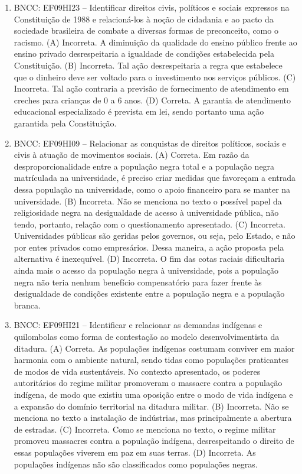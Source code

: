 
\begin{enumerate}
\item
BNCC: EF09HI23 -- Identificar direitos civis, políticos e sociais
expressos na Constituição de 1988 e relacioná-los à noção de cidadania e
ao pacto da sociedade brasileira de combate a diversas formas de
preconceito, como o racismo. (A) Incorreta. A diminuição da qualidade do ensino público frente ao ensino privado desrespeitaria a igualdade de condições estabelecida pela Constituição. (B) Incorreta. Tal ação desrespeitaria a regra que estabelece que o dinheiro deve ser voltado para o investimento nos serviços públicos. (C) Incorreta. Tal ação contraria a previsão de fornecimento de atendimento em creches para crianças de 0 a 6 anos. (D) Correta. A garantia de atendimento educacional especializado é prevista em lei, sendo portanto uma ação garantida pela Constituição.

\item
BNCC: EF09HI09 -- Relacionar as conquistas de direitos políticos,
sociais e civis à atuação de movimentos sociais. (A) Correta. Em razão da desproporcionalidade entre a população negra total e a população negra matrículada na universidade, é preciso criar medidas que favoreçam a entrada dessa população na universidade, como o apoio financeiro para se manter na universidade. (B) Incorreta. Não se menciona no texto o possível papel da religiosidade negra na desigualdade de acesso à universidade pública, não tendo, portanto, relação com o questionamento apresentado. (C) Incorreta. Universidades públicas são geridas pelos governos, ou seja, pelo Estado, e não por entes privados como empresários. Dessa maneira, a ação proposta pela alternativa é inexequível. (D) Incorreta. O fim das cotas raciais dificultaria ainda mais o acesso da população negra à universidade, pois a população negra não teria nenhum benefício compensatório para fazer frente às desigualdade de condições existente entre a população negra e a população branca. 

\item
BNCC: EF09HI21 -- Identificar e relacionar as demandas indígenas e
quilombolas como forma de contestação ao modelo desenvolvimentista da
ditadura. (A) Correta. As populações indígenas costumam conviver em maior harmonia com o ambiente natural, sendo tidas como populações praticantes de modos de vida sustentáveis. No contexto apresentado, os poderes autoritários do regime militar promoveram o massacre contra a população indígena, de modo que existiu uma oposição entre o modo de vida indígena e a expansão do domínio territorial na ditadura militar. (B) Incorreta. Não se menciona no texto a instalação de indústrias, mas principalmente a abertura de estradas. (C) Incorreta. Como se menciona no texto, o regime militar promoveu massacres contra a população indígena, desrespeitando o direito de essas populações viverem em paz em suas terras. (D) Incorreta. As populações indígenas não são classificados como populações negras.
\end{enumerate}


